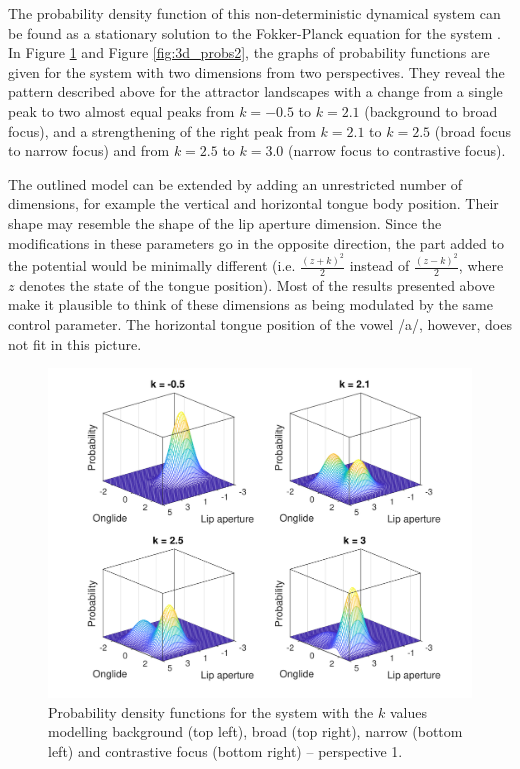 The probability density function of this non-deterministic dynamical system can be found as a stationary solution to the Fokker-Planck equation for the system \citep{Haken1977, GafosBenus2006}. In Figure \ref{fig:3d_probs1} and Figure \ref{fig:3d_probs2}, the graphs of probability functions are given for the system with two dimensions from two perspectives. They reveal the pattern described above for the attractor landscapes with a change from a single peak to two almost equal peaks from $k = -0.5$ to $k = 2.1$ (background to broad focus), and a strengthening of the right peak from $k = 2.1$ to $k = 2.5$ (broad focus to narrow focus) and from $k = 2.5$ to $k = 3.0$ (narrow focus to contrastive focus). 

The outlined model can be extended by adding an unrestricted number of dimensions, for example the vertical and horizontal tongue body position. Their shape may resemble the shape of the lip aperture dimension. Since the modifications in these parameters go in the opposite direction, the part added to the potential would be minimally different (i.e. $\frac{(z+k)^2}{2}$ instead of $\frac{(z-k)^2}{2}$, where $z$ denotes the state of the tongue position). Most of the results presented above make it plausible to think of these dimensions as being modulated by the same control parameter. The horizontal tongue position of the vowel /a/, however, does not fit in this picture.

\begin{figure}[htbp]
\begin{center}
\includegraphics[width=\textwidth]{figures/ch7/probabilities1.pdf}
\caption[Probability density functions for the system with the $k$ values modelling background, broad, narrow and contrastive focus -- perspective 1.]{Probability density functions for the system with the $k$ values modelling background (top left), broad (top right), narrow (bottom left) and contrastive focus (bottom right) -- perspective 1.}
\label{fig:3d_probs1}
\end{center}
\end{figure}

